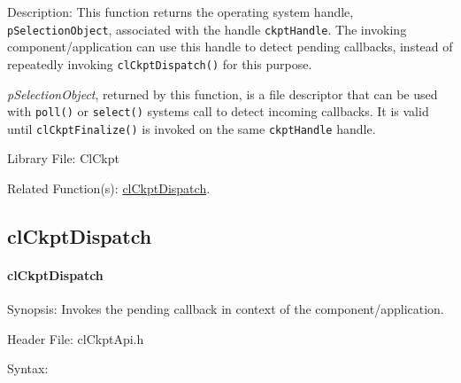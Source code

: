 \begin{flushleft}
\begin{Desc}
\begin{description}
\end{description}
\end{Desc}
\begin{Desc}
\item[Description:]This function returns the operating system handle, {\tt{p\-Selection\-Object}}, associated with the handle {\tt{ckpt\-Handle}}. 
The invoking component/application can use this handle to detect pending callbacks, instead of repeatedly invoking {\tt{clCkptDispatch()}}
for this purpose.\par
 \par
 {\em p\-Selection\-Object\/}, returned by this function, is a file descriptor that can be used with {\tt{poll()}} or {\tt{select()}} systems call to detect incoming 
 callbacks. It is valid until {\tt{clCkptFinalize()}} is invoked on the same {\tt{ckpt\-Handle}} handle.
\end{Desc}
\begin{Desc}
\item[Library File:]Cl\-Ckpt\end{Desc}
\begin{Desc}
\item[Related Function(s):]\hyperlink{pageckpt123}{cl\-Ckpt\-Dispatch}. \end{Desc}
\newpage


\subsection{clCkptDispatch}
\hypertarget{pageckpt123}{}\paragraph{cl\-Ckpt\-Dispatch}\label{pageckpt123}
\begin{Desc}
\item[Synopsis:]Invokes the pending callback in context of the component/application.\end{Desc}
\begin{Desc}
\item[Header File:]clCkptApi.h\end{Desc}
\begin{Desc}
\item[Syntax:]


\end{Desc}
\end{flushleft}
